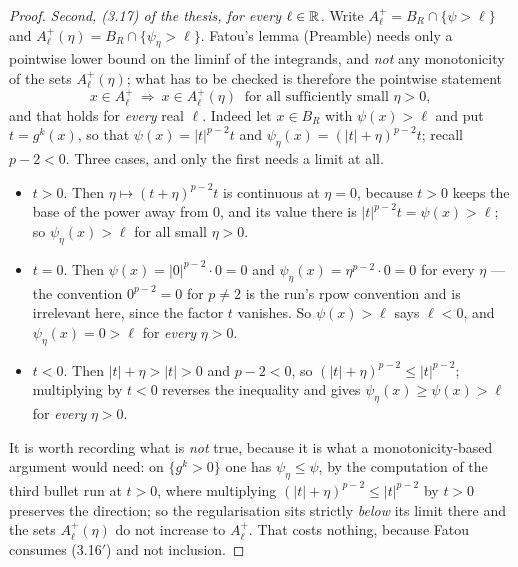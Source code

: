 \begin{proof}
\emph{Second, (3.17) of the thesis, for every $\ell\in\mathbb{R}$.}  Write
$A^+_\ell=B_R\cap\{\psi>\ell\}$ and $A^+_\ell(\eta)=B_R\cap\{\psi_\eta>\ell\}$.
Fatou's lemma (Preamble) needs only a pointwise lower bound on the liminf of the
integrands, and \emph{not} any monotonicity of the sets $A^+_\ell(\eta)$; what
has to be checked is therefore the pointwise statement
\[
x\in A^+_\ell\ \Longrightarrow\ x\in A^+_\ell(\eta)\ \text{ for all sufficiently
small }\eta>0 ,
\tag{3.16$'$}
\]
and that holds for \emph{every} real $\ell$.  Indeed let $x\in B_R$ with
$\psi(x)>\ell$ and put $t=g^k(x)$, so that $\psi(x)=|t|^{p-2}t$ and
$\psi_\eta(x)=(|t|+\eta)^{p-2}t$; recall $p-2<0$.  Three cases, and only the
first needs a limit at all.
\begin{itemize}
\item $t>0$.  Then $\eta\mapsto(t+\eta)^{p-2}t$ is continuous at $\eta=0$,
  because $t>0$ keeps the base of the power away from $0$, and its value there is
  $|t|^{p-2}t=\psi(x)>\ell$; so $\psi_\eta(x)>\ell$ for all small $\eta>0$.
\item $t=0$.  Then $\psi(x)=|0|^{p-2}\cdot0=0$ and
  $\psi_\eta(x)=\eta^{p-2}\cdot0=0$ for every $\eta$ --- the convention
  $0^{p-2}=0$ for $p\ne2$ is the run's rpow convention and is irrelevant here,
  since the factor $t$ vanishes.  So $\psi(x)>\ell$ says $\ell<0$, and
  $\psi_\eta(x)=0>\ell$ for \emph{every} $\eta>0$.
\item $t<0$.  Then $|t|+\eta>|t|>0$ and $p-2<0$, so
  $(|t|+\eta)^{p-2}\le|t|^{p-2}$; multiplying by $t<0$ reverses the inequality
  and gives $\psi_\eta(x)\ge\psi(x)>\ell$ for \emph{every} $\eta>0$.
\end{itemize}
It is worth recording what is \emph{not} true, because it is what a
monotonicity-based argument would need: on $\{g^k>0\}$ one has
$\psi_\eta\le\psi$, by the computation of the third bullet run at $t>0$, where
multiplying $(|t|+\eta)^{p-2}\le|t|^{p-2}$ by $t>0$ preserves the direction; so the
regularisation sits strictly \emph{below} its limit there and the sets
$A^+_\ell(\eta)$ do not increase to $A^+_\ell$.  That costs nothing, because
Fatou consumes (3.16$'$) and not inclusion.


\end{proof}
